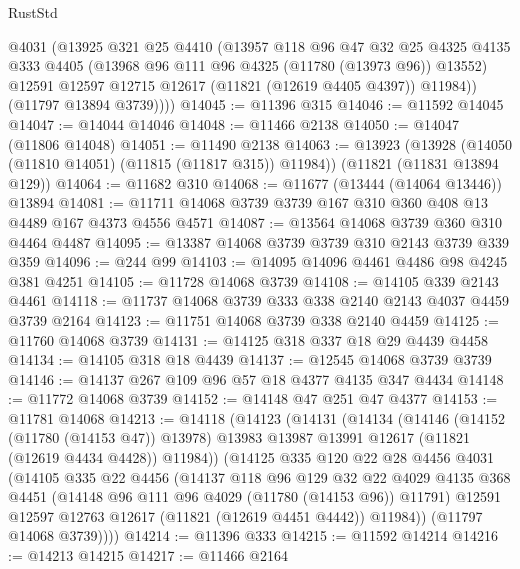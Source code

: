\begin{lexlean}{RustStd}
\begin{coremodule}
          @4031
          (@13925
            @321
            @25
            @4410
            (@13957
              @118
              @96
              @47
              @32
              @25
              @4325
              @4135
              @333
              @4405
              (@13968 @96 @111 @96 @4325 (@11780 (@13973 @96)) @13552)
              @12591
              @12597
              @12715
              @12617
              (@11821 (@12619 @4405 @4397))
              @11984))
          (@11797 @13894 @3739))))
@14045 := @11396 @315
@14046 := @11592 @14045
@14047 := @14044 @14046
@14048 := @11466 @2138
@14050 := @14047 (@11806 @14048)
@14051 := @11490 @2138
@14063 := @13923
    (@13928 (@14050 (@11810 @14051) (@11815 (@11817 @315)) @11984))
    (@11821 (@11831 @13894 @129))
@14064 := @11682 @310
@14068 := @11677 (@13444 (@14064 @13446)) @13894
@14081 := @11711 @14068 @3739 @3739 @167 @310 @360 @408 @13 @4489 @167 @4373 @4556 @4571
@14087 := @13564 @14068 @3739 @360 @310 @4464 @4487
@14095 := @13387 @14068 @3739 @3739 @310 @2143 @3739 @339 @359
@14096 := @244 @99
@14103 := @14095 @14096 @4461 @4486 @98 @4245 @381 @4251
@14105 := @11728 @14068 @3739
@14108 := @14105 @339 @2143 @4461
@14118 := @11737 @14068 @3739 @333 @338 @2140 @2143 @4037 @4459 @3739 @2164
@14123 := @11751 @14068 @3739 @338 @2140 @4459
@14125 := @11760 @14068 @3739
@14131 := @14125 @318 @337 @18 @29 @4439 @4458
@14134 := @14105 @318 @18 @4439
@14137 := @12545 @14068 @3739 @3739
@14146 := @14137 @267 @109 @96 @57 @18 @4377 @4135 @347 @4434
@14148 := @11772 @14068 @3739
@14152 := @14148 @47 @251 @47 @4377
@14153 := @11781 @14068
@14213 := @14118
    (@14123
      (@14131
        (@14134
          (@14146
            (@14152 (@11780 (@14153 @47)) @13978)
            @13983
            @13987
            @13991
            @12617
            (@11821 (@12619 @4434 @4428))
            @11984))
        (@14125
          @335
          @120
          @22
          @28
          @4456
          @4031
          (@14105
            @335
            @22
            @4456
            (@14137
              @118
              @96
              @129
              @32
              @22
              @4029
              @4135
              @368
              @4451
              (@14148 @96 @111 @96 @4029 (@11780 (@14153 @96)) @11791)
              @12591
              @12597
              @12763
              @12617
              (@11821 (@12619 @4451 @4442))
              @11984))
          (@11797 @14068 @3739))))
@14214 := @11396 @333
@14215 := @11592 @14214
@14216 := @14213 @14215
@14217 := @11466 @2164

\end{coremodule}
\end{lexlean}
